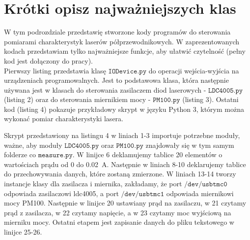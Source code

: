 \section{Krótki opisz najważniejszych klas}
W tym podrozdziale przedstawię stworzone kody programów do sterowania pomiarami charakterystyk laserów półprzewodnikowych.
 W zaprezentowanych kodach przedstawiam tylko najważniejsze funkcje, aby ułatwić czytelność (pełny kod jest dołączony do pracy). \\
Pierwszy listing przedstawia klasę $\mathtt{IODevice.py}$ do operacji  wejścia-wyjścia na urządzeniach programowalnych.
Jest to podstawowa klasa, która następnie używana jest w klasach do sterowania zasilaczem
diod laserowych - $\mathtt{LDC4005.py}$ (listing 2) oraz do sterowania miernikiem mocy - $\mathtt{PM100.py}$ (listing 3).
Ostatni kod (listing 4) pokazuje przykładowy skrypt w języku Python 3, którym można wykonać pomiar charakterystyki lasera.
\newpage



Skrypt przedstawiony na listingu 4 w liniach 1-3 importuje potrzebne moduły, ważne, aby moduły $\mathtt{LDC4005.py}$ oraz $\mathtt{PM100.py}$ znajdowały się w tym samym folderze co $\mathtt{measure.py}$.
W linijce 6 deklamujemy tablice 20 elementów o wartościach prądu od 0 do 0.02 \,A. Następnie w liniach 8-10 deklarujemy tablice do przechowywania danych, które zostaną zmierzone. W liniach 13-14 tworzy instancje klasy dla zasilacza i miernika, zakładamy, że port $\mathtt{/dev/usbtmc0}$ odpowiada zasilaczowi ldc4005, a port $\mathtt{/dev/usbtmc1}$ odpowiada miernikowi mocy PM100.
Następnie w linijce 20 ustawiany prąd na zasilaczu, w 21 czytamy prąd z zasilacza, w 22 czytamy napięcie, a w 23 czytamy moc wyjściową na mierniku mocy. Ostatni etapem jest zapisanie danych do pliku tekstowego w linijce 25-26.

